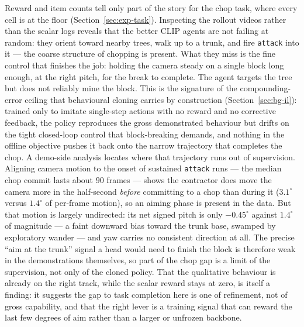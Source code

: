 Reward and item counts tell only part of the story for the chop task, where every
cell is at the floor (Section~\ref{sec:exp-task}). Inspecting the rollout videos
rather than the scalar logs reveals that the better CLIP agents are not failing
at random: they orient toward nearby trees, walk up to a trunk, and fire
\texttt{attack} into it --- the coarse structure of chopping is present. What they
miss is the fine control that finishes the job: holding the camera steady on a
single block long enough, at the right pitch, for the break to complete. The
agent targets the tree but does not reliably mine the block. This is the
signature of the compounding-error ceiling that behavioural cloning carries by
construction (Section~\ref{sec:bg-il}): trained only to imitate single-step
actions with no reward and no corrective feedback, the policy reproduces the
gross demonstrated behaviour but drifts on the tight closed-loop control that
block-breaking demands, and nothing in the offline objective pushes it back onto
the narrow trajectory that completes the chop. A demo-side analysis locates where
that trajectory runs out of supervision. Aligning camera motion to the onset of
sustained \texttt{attack} runs --- the median chop commit lasts about $90$ frames
--- shows the contractor does move the camera more in the half-second \emph{before}
committing to a chop than during it ($3.1^\circ$ versus $1.4^\circ$ of per-frame
motion), so an aiming phase is present in the data. But that motion is largely
undirected: its net signed pitch is only $-0.45^\circ$ against $1.4^\circ$ of
magnitude --- a faint downward bias toward the trunk base, swamped by exploratory
wander --- and yaw carries no consistent direction at all. The precise
\enquote{aim at the trunk} signal a head would need to finish the block is
therefore weak in the demonstrations themselves, so part of the chop gap is a
limit of the supervision, not only of the cloned policy. That the qualitative
behaviour is already on the right track, while the scalar reward stays at zero, is itself a
finding: it suggests the gap to task completion here is one of refinement, not of
gross capability, and that the right lever is a training signal that can reward
the last few degrees of aim rather than a larger or unfrozen backbone.

